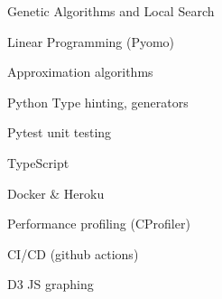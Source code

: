Genetic Algorithms and Local Search

Linear Programming (Pyomo)

Approximation algorithms

Python Type hinting, generators 

Pytest unit testing

TypeScript

Docker \& Heroku

Performance profiling (CProfiler)

CI/CD (github actions)

D3 JS graphing